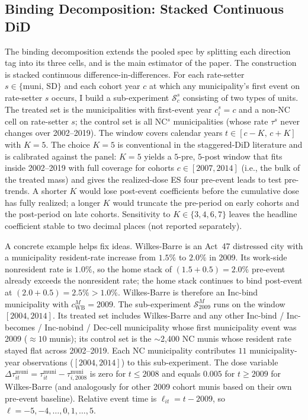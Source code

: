 \documentclass[12pt]{article}
\begin{document}
\subsection{Binding Decomposition: Stacked Continuous DiD}
\label{subsec:stacked-continuous}

The binding decomposition extends the pooled spec by splitting
each direction tag into its three cells, and is the
main estimator of the paper. The construction is stacked continuous
difference-in-differences. For each rate-setter
$s \in \{\text{muni},\, \text{SD}\}$ and each cohort year $c$ at
which any municipality's first event on rate-setter $s$ occurs, I build a
sub-experiment $\mathcal{S}^s_c$ consisting of two types of units.
The treated set is the municipalities with first-event year
$c^s_i = c$ and a non-NC cell on rate-setter $s$; the control set is all
NC$^s$ municipalities (whose rate $\tau^s$ never changes over
2002--2019). The window covers calendar years $t \in [c-K,\, c+K]$
with $K=5$. The choice $K=5$ is conventional in the staggered-DiD
literature \citep[e.g.,][]{cengizEffectMinimumWages2019a} and is
calibrated against the panel:
$K=5$ yields a $5$-pre, $5$-post window that fits inside
2002--2019 with full coverage for cohorts $c \in [2007, 2014]$
(i.e., the bulk of the treated mass) and gives the
realized-dose ES four pre-event leads to test pre-trends. A
shorter $K$ would lose post-event coefficients before the cumulative
dose has fully realized; a longer $K$ would truncate the pre-period
on early cohorts and the post-period on late cohorts. Sensitivity to
$K \in \{3, 4, 6, 7\}$ leaves the headline coefficient stable to
two decimal places (not reported separately).

A concrete example helps fix ideas. Wilkes-Barre is an Act~47
distressed city with a municipality resident-rate increase from $1.5\%$ to
$2.0\%$ in 2009. Its work-side nonresident rate is $1.0\%$, so the
home stack of $(1.5 + 0.5) = 2.0\%$ pre-event already exceeds the
nonresident rate; the home stack continues to bind post-event at
$(2.0 + 0.5) = 2.5\% > 1.0\%$. Wilkes-Barre is therefore an
Inc-bind municipality with $c^M_{\text{WB}} = 2009$. The sub-experiment
$\mathcal{S}^M_{2009}$ runs on the window $[2004, 2014]$. Its
treated set includes Wilkes-Barre and any other Inc-bind /
Inc-becomes / Inc-nobind / Dec-cell municipality whose first municipality
event was 2009 ($\approx 10$ munis); its control set is the
$\sim$2{,}400 NC munis whose resident rate stayed flat across
2002--2019. Each NC municipality contributes $11$ municipality-year observations
($[2004, 2014]$) to this sub-experiment. The dose variable
$\Delta\tau^{\text{muni}}_{it} = \tau^{\text{muni}}_{it} - \tau^{\text{muni}}_{i, 2008}$
is zero for $t \leq 2008$ and equals $0.005$ for $t \geq 2009$ for
Wilkes-Barre (and analogously for other 2009 cohort munis based on
their own pre-event baseline). Relative event time is
$\ell_{it} = t - 2009$, so $\ell = -5,-4,\dots,0,1,\dots,5$.
\end{document}
